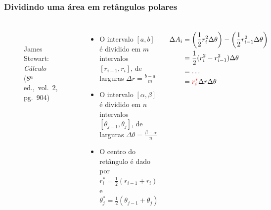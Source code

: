 \documentclass[pdftex, brazil, aspectratio=169]{beamer}
\begin{document}
\begin{frame}
  \frametitle{Dividindo uma área em retângulos polares}
  \begin{columns}
    \centering
  \begin{figure}[H]
    \begin{center}
      \label{fig:int2-30}
      \\
      \footnotesize{James Stewart: \emph{Cálculo}\\ (8ª ed.,\ vol.\ 2, pg.\ 904)}
    \end{center}
  \end{figure}
    \centering
  \begin{itemize}
    \item O intervalo $[a, b]$ é dividido em $m$ intervalos $[r_{i-1},
      r_i]$, de larguras $\displaystyle \Delta r = \frac{b-a}{m}$
    \item O intervalo $[\alpha, \beta]$ é dividido em $n$ intervalos
      $[\theta_{j-1}, \theta_j]$, de larguras $\displaystyle \Delta
      \theta = \frac{\beta - \alpha}{n}$
    \item O centro do retângulo é dado por $r_i^* = \frac{1}{2}(r_{i-1}+r_i)$ e $\theta_j^*
      = \frac{1}{2}(\theta_{j-1}+\theta_j)$
  \end{itemize}
  \vspace{0.4cm}
  \begin{equation}
    \begin{split}
      \Delta A_i &= \left(\frac{1}{2} r_i^2\Delta \theta\right) - \left(\frac{1}{2} r_{i-1}^2\Delta \theta\right)\\
                 &= \frac{1}{2}(r_i^2 - r_{i-1}^2)\Delta \theta\\
                 &= \ldots\\
                 &= \color{red}r_i^*\color{black} \Delta r \Delta \theta
    \end{split}
  \end{equation}
  \end{columns}
\end{frame}
\end{document}

